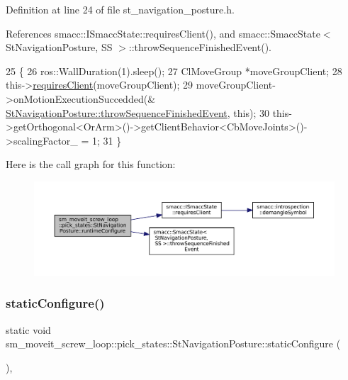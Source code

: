 Definition at line 24 of file st\+\_\+navigation\+\_\+posture.\+h.



References smacc\+::\+I\+Smacc\+State\+::requires\+Client(), and smacc\+::\+Smacc\+State$<$ St\+Navigation\+Posture, S\+S $>$\+::throw\+Sequence\+Finished\+Event().


\begin{DoxyCode}
25     \{
26         ros::WallDuration(1).sleep();
27         ClMoveGroup *moveGroupClient;
28         this->\hyperlink{classsmacc_1_1ISmaccState_a7f95c9f0a6ea2d6f18d1aec0519de4ac}{requiresClient}(moveGroupClient);
29         moveGroupClient->onMotionExecutionSuccedded(&
      \hyperlink{classsmacc_1_1SmaccState_a49dcfc25824f7e083dd4b999c49ab2b6}{StNavigationPosture::throwSequenceFinishedEvent}, \textcolor{keyword}{this});
30         this->getOrthogonal<OrArm>()->getClientBehavior<CbMoveJoints>()->scalingFactor\_ = 1;
31     \}
\end{DoxyCode}
Here is the call graph for this function\+:
\nopagebreak
\begin{figure}[H]
\begin{center}
\leavevmode
\includegraphics[width=350pt]{structsm__moveit__screw__loop_1_1pick__states_1_1StNavigationPosture_afe3f2a941d6ad586925db22af5c8cc89_cgraph}
\end{center}
\end{figure}
\mbox{\label{structsm__moveit__screw__loop_1_1pick__states_1_1StNavigationPosture_aceb3ac6c28027eb0d3b92752fc1dc978}} 
\subsubsection{\texorpdfstring{static\+Configure()}{staticConfigure()}}
{\footnotesize\ttfamily static void sm\+\_\+moveit\+\_\+screw\+\_\+loop\+::pick\+\_\+states\+::\+St\+Navigation\+Posture\+::static\+Configure (\begin{DoxyParamCaption}{ }\end{DoxyParamCaption})\hspace{0.3cm}{\ttfamily [inline]}, {\ttfamily [static]}}



